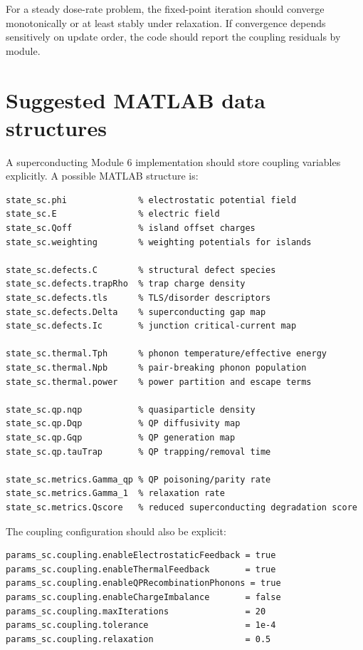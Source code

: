 \documentclass[11pt]{article}
\begin{document}
For a steady dose-rate problem, the fixed-point iteration should converge monotonically or at least stably under relaxation. If convergence depends sensitively on update order, the code should report the coupling residuals by module.

\section{Suggested MATLAB data structures}

A superconducting Module 6 implementation should store coupling variables explicitly. A possible MATLAB structure is:

\begin{verbatim}
state_sc.phi              % electrostatic potential field
state_sc.E                % electric field
state_sc.Qoff             % island offset charges
state_sc.weighting        % weighting potentials for islands

state_sc.defects.C        % structural defect species
state_sc.defects.trapRho  % trap charge density
state_sc.defects.tls      % TLS/disorder descriptors
state_sc.defects.Delta    % superconducting gap map
state_sc.defects.Ic       % junction critical-current map

state_sc.thermal.Tph      % phonon temperature/effective energy
state_sc.thermal.Npb      % pair-breaking phonon population
state_sc.thermal.power    % power partition and escape terms

state_sc.qp.nqp           % quasiparticle density
state_sc.qp.Dqp           % QP diffusivity map
state_sc.qp.Gqp           % QP generation map
state_sc.qp.tauTrap       % QP trapping/removal time

state_sc.metrics.Gamma_qp % QP poisoning/parity rate
state_sc.metrics.Gamma_1  % relaxation rate
state_sc.metrics.Qscore   % reduced superconducting degradation score
\end{verbatim}

The coupling configuration should also be explicit:

\begin{verbatim}
params_sc.coupling.enableElectrostaticFeedback = true
params_sc.coupling.enableThermalFeedback       = true
params_sc.coupling.enableQPRecombinationPhonons = true
params_sc.coupling.enableChargeImbalance       = false
params_sc.coupling.maxIterations               = 20
params_sc.coupling.tolerance                   = 1e-4
params_sc.coupling.relaxation                  = 0.5
\end{verbatim}
\end{document}
